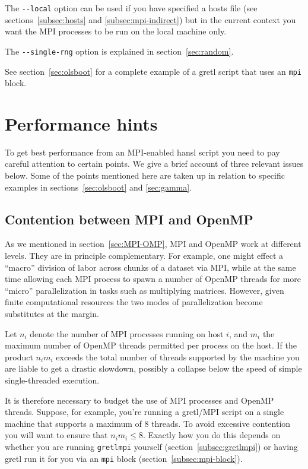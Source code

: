 \documentclass{article}
\begin{document}
The \verb|--local| option can be used if you have specified a hosts
file (see sections~\ref{subsec:hosts} and \ref{subsec:mpi-indirect})
but in the current context you want the MPI processes to be run on the
local machine only.

The \verb|--single-rng| option is explained in
section~\ref{sec:random}.

\vspace{1ex}

See section~\ref{sec:olsboot} for a complete example of a gretl script
that uses an \texttt{mpi} block.

\section{Performance hints}
\label{sec:performance}

To get best performance from an MPI-enabled hansl script you need to
pay careful attention to certain points. We give a brief account of
three relevant issues below. Some of the points mentioned here are
taken up in relation to specific examples in
sections~\ref{sec:olsboot} and \ref{sec:gamma}.

\subsection{Contention between MPI and OpenMP}
\label{sec:contention}

As we mentioned in section~\ref{sec:MPI-OMP}, MPI and \textsf{OpenMP}
work at different levels. They are in principle complementary. For
example, one might effect a ``macro'' division of labor across chunks
of a dataset via MPI, while at the same time allowing each MPI process
to spawn a number of \textsf{OpenMP} threads for more ``micro''
parallelization in tasks such as multiplying matrices.
However, given finite computational resources the two modes of
parallelization become substitutes at the margin.

Let $n_i$ denote the number of MPI processes running on host $i$,
and $m_i$ the maximum number of \textsf{OpenMP} threads permitted per
process on the host. If the product $n_im_i$ exceeds the total number
of threads supported by the machine you are liable to get a drastic
slowdown, possibly a collapse below the speed of simple
single-threaded execution.

It is therefore necessary to budget the use of MPI processes and
\textsf{OpenMP} threads. Suppose, for example, you're running a
gretl/MPI script on a single machine that supports a maximum of 8
threads. To avoid excessive contention you will want to ensure that
$n_im_i \leq 8$. Exactly how you do this depends on whether you are
running \texttt{gretlmpi} yourself
(section~\ref{subsec:gretlmpi}) or having gretl run it for you via
an \texttt{mpi} block (section~\ref{subsec:mpi-block}).
\end{document}
